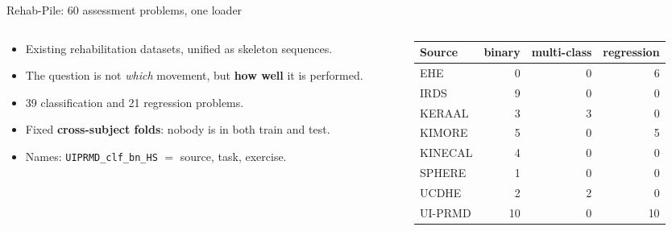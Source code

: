 \documentclass[aspectratio=169,10pt]{beamer}
\begin{document}
\begin{frame}{Rehab-Pile: 60 assessment problems, one loader}
  \begin{columns}[c]
    \begin{column}{0.50\textwidth}
      \begin{itemize}
        \item Existing rehabilitation datasets, unified as skeleton sequences.
        \item The question is not \emph{which} movement, but \textbf{how well} it is performed.
        \item 39 classification and 21 regression problems.
        \item Fixed \textbf{cross-subject folds}: nobody is in both train and test.
        \item Names: \texttt{UIPRMD\_clf\_bn\_HS} $=$ source, task, exercise.
      \end{itemize}
    \end{column}
    \begin{column}{0.46\textwidth}
      \centering\small
      \begin{tabular}{@{}lrrr@{}}
        \toprule
        Source & binary & multi-class & regression \\
        \midrule
        EHE     &  0 & 0 &  6 \\
        IRDS    &  9 & 0 &  0 \\
        KERAAL  &  3 & 3 &  0 \\
        KIMORE  &  5 & 0 &  5 \\
        KINECAL &  4 & 0 &  0 \\
        SPHERE  &  1 & 0 &  0 \\
        UCDHE   &  2 & 2 &  0 \\
        UI-PRMD & 10 & 0 & 10 \\
        \bottomrule
      \end{tabular}
    \end{column}
  \end{columns}
  \vfill
\end{frame}
\end{document}
